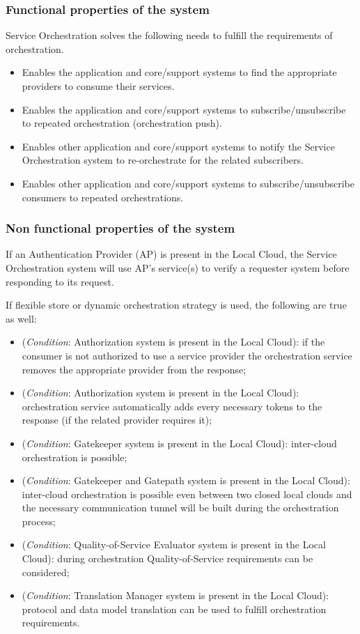 \documentclass[a4paper]{arrowhead}
\begin{document}
\subsubsection {Functional properties of the system}
Service Orchestration solves the following needs to fulfill the requirements of orchestration.

\begin{itemize}
    \item Enables the application and core/support systems to find the appropriate providers to consume their services.
    \item Enables the application and core/support systems to subscribe/unsubscribe to repeated orchestration (orchestration push).
    \item Enables other application and core/support systems to notify the Service Orchestration system to re-orchestrate for the related subscribers.
    \item Enables other application and core/support systems to subscribe/unsubscribe consumers to repeated orchestrations.
\end{itemize}

\subsubsection {Non functional properties of the system}
If an Authentication Provider (AP) is present in the Local Cloud, the Service Orchestration system will use AP's service(s) to verify a requester system before responding to its request.  

If flexible store or dynamic orchestration strategy is used, the following are true as well:

\begin{itemize}
    \item (\textit{Condition}: Authorization system is present in the Local Cloud): if the consumer is not authorized to use a service provider the orchestration service removes the appropriate provider from the response;
    \item (\textit{Condition}: Authorization system is present in the Local Cloud): orchestration service automatically adds every necessary tokens to the response (if the related provider requires it);
    \item (\textit{Condition}: Gatekeeper system is present in the Local Cloud): inter-cloud orchestration is possible;
    \item (\textit{Condition}: Gatekeeper and Gatepath system is present in the Local Cloud): inter-cloud orchestration is possible even between two closed local clouds and the necessary communication tunnel will be built during the orchestration process;
    \item (\textit{Condition}: Quality-of-Service Evaluator system is present in the Local Cloud): during orchestration Quality-of-Service requirements can be considered;
    \item (\textit{Condition}: Translation Manager system is present in the Local Cloud): protocol and data model translation can be used to fulfill orchestration requirements.
\end{itemize}
\end{document}
